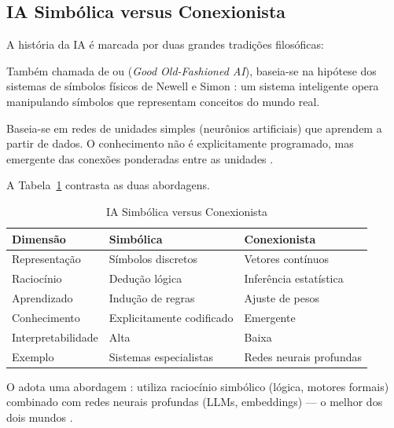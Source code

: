 \subsection{IA Simbólica versus Conexionista}
A história da IA é marcada por duas grandes tradições filosóficas:
\begin{definicao}[IA Simbólica]
Também chamada de  ou  (\textit{Good
Old-Fashioned AI}), baseia-se na hipótese dos sistemas de símbolos físicos
de Newell e Simon \cite{newell1976physical}: um sistema inteligente opera
manipulando símbolos que representam conceitos do mundo real.
\end{definicao}
\begin{definicao}[IA Conexionista]
Baseia-se em redes de unidades simples (neurônios artificiais) que aprendem
a partir de dados. O conhecimento não é explicitamente programado, mas
emergente das conexões ponderadas entre as unidades
\cite{mcculloch1943logical, rosenblatt1958perceptron}.
\end{definicao}
A Tabela~\ref{tab:simbólica-conexionista} contrasta as duas abordagens.
\begin{table}[htb]
\centering
\caption{IA Simbólica versus Conexionista}
\label{tab:simbólica-conexionista}
\begin{tabular}{lll}
\toprule
\textbf{Dimensão} & \textbf{Simbólica} & \textbf{Conexionista} \\
\midrule
Representação & Símbolos discretos & Vetores contínuos \\
Raciocínio & Dedução lógica & Inferência estatística \\
Aprendizado & Indução de regras & Ajuste de pesos \\
Conhecimento & Explicitamente codificado & Emergente \\
Interpretabilidade & Alta & Baixa \\
Exemplo & Sistemas especialistas & Redes neurais profundas \\
\bottomrule
\end{tabular}
\end{table}
O \opencodeeco{} adota uma abordagem : utiliza
raciocínio simbólico (lógica, motores formais) combinado com redes neurais
profundas (LLMs, embeddings) --- o melhor dos dois mundos
\cite{opencode2026ecosystem}.
